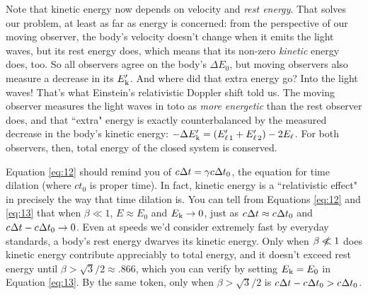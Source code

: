 \documentclass[12pt]{article}
\begin{document}
Note that kinetic energy now depends on velocity and \emph{rest energy}. That solves our problem, at least as far as energy is concerned: from the perspective of our moving observer, the body's velocity doesn't change when it emits the light waves, but its rest energy does, which means that its non-zero \emph{kinetic} energy does, too. So all observers agree on the body's $\Delta E_0$, but moving observers also measure a decrease in its $E_{\mkern.5mu \textrm{k}}^\prime$. And where did that extra energy go? Into the light waves! That's what Einstein's relativistic Doppler shift told us. The moving observer measures the light waves in toto as \emph{more energetic} than the rest observer does, and that ``extra" energy is exactly counterbalanced by the measured decrease in the body's kinetic energy: $-\Delta E_{\mkern.5mu \textrm{k}}^\prime = (E_{\ell \, 1}^{\prime} + E_{\ell \, 2}^{\prime}) - 2E_{\ell}$. For both observers, then, total energy of the closed system is conserved.

Equation \ref{eq:12} should remind you of $c \mkern.5mu \Delta t=\gamma c \mkern.5mu \Delta t_0$, the equation for time dilation (where $ct_0$ is proper time). In fact, kinetic energy is a ``relativistic effect" in precisely the way that time dilation is. You can tell from Equations \ref{eq:12} and \ref{eq:13} that when $\beta \ll 1$, $E \approx E_0$ and $E_{\mkern.5mu \textrm{k}} \rightarrow 0$, just as $c \mkern.5mu \Delta t \approx c \mkern.5mu \Delta t_0$ and $c \mkern.5mu \Delta t - c \mkern.5mu \Delta t_0 \rightarrow 0$. Even at speeds we'd consider extremely fast by everyday standards, a body's rest energy dwarves its kinetic energy. Only when $\beta \centernot{\ll} 1$ does kinetic energy contribute appreciably to total energy, and it doesn't exceed rest energy until $\beta > \sqrt{3}/2 \approx .866$, which you can verify by setting $E_{\mkern.5mu \textrm{k}}=E_0$ in Equation \ref{eq:13}. By the same token, only when $\beta > \sqrt{3}/2$ is $c \mkern.5mu \Delta t - c \mkern.5mu \Delta t_0 > c \mkern.5mu \Delta t_0$.
\end{document}
